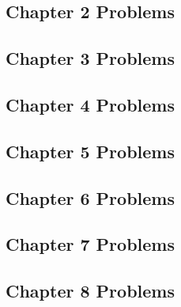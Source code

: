 \documentclass[
  11pt,
  openany]{book}
\begin{document}
\newpage

\newpage

\subsection*{Chapter 2 Problems}\label{chapter-2-problems}

\newpage

\newpage

\subsection*{Chapter 3 Problems}\label{chapter-3-problems}

\newpage

\newpage

\subsection*{Chapter 4 Problems}\label{chapter-4-problems}

\newpage

\newpage

\subsection*{Chapter 5 Problems}\label{chapter-5-problems}

\newpage

\newpage

\subsection*{Chapter 6 Problems}\label{chapter-6-problems}

\newpage

\newpage

\subsection*{Chapter 7 Problems}\label{chapter-7-problems}

\newpage

\newpage

\subsection*{Chapter 8 Problems}\label{chapter-8-problems}
\end{document}

